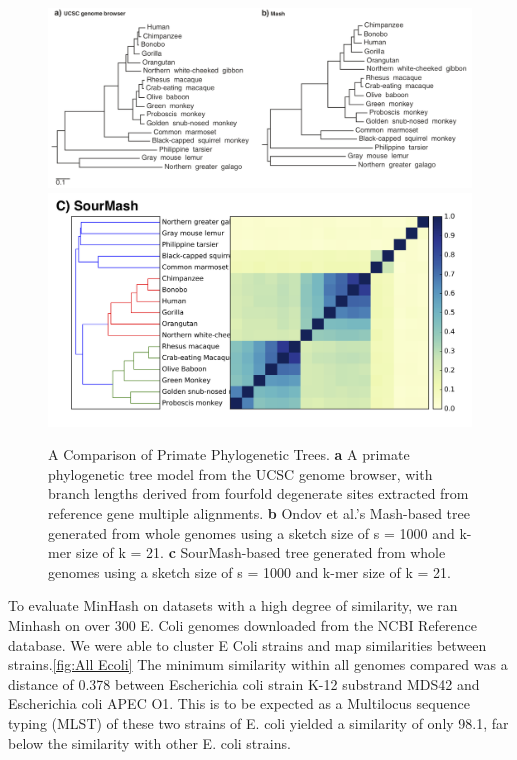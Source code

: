 \documentclass[12pt, letterpaper]{article}
\begin{document}
\begin{figure}[h]
    \centering
    \includegraphics[width=1.0\textwidth]{Figure4_Ondov}
    \includegraphics[width=1.0\textwidth]{Apes_Matrix_Common}
    \caption{A Comparison of Primate Phylogenetic Trees. \textbf{a} A primate phylogenetic tree model from the UCSC genome browser, with branch lengths derived from fourfold degenerate sites extracted from reference gene multiple alignments. \textbf{b} Ondov et al.'s Mash-based tree generated from whole genomes using a sketch size of s = 1000 and k-mer size of k = 21.\cite{MinHash} \textbf{c} SourMash-based tree generated from whole genomes using a sketch size of s = 1000 and k-mer size of k = 21.}
    \label{fig:Primate Tree}
\end{figure}

To evaluate MinHash on datasets with a high degree of similarity, we ran Minhash on over 300 E. Coli genomes downloaded from the NCBI Reference database. We were able to cluster E Coli strains and map similarities between strains.\ref{fig:All Ecoli} The minimum similarity within all genomes compared was a distance of 0.378 between Escherichia coli strain K-12 substrand MDS42 and Escherichia coli APEC O1. This is to be expected as a Multilocus sequence typing (MLST) of these two strains of E. coli yielded a similarity of only 98.1, far below the similarity with other E. coli strains.\cite{E coli}
\end{document}
